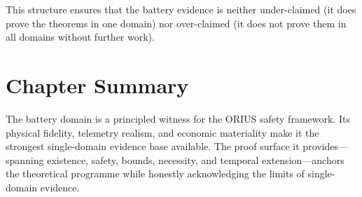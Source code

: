 This structure ensures that the battery evidence is neither under-claimed
(it does prove the theorems in one domain) nor over-claimed (it does not
prove them in all domains without further work).

\section{Chapter Summary}

The battery domain is a principled witness for the ORIUS safety framework.
Its physical fidelity, telemetry realism, and economic materiality make it
the strongest single-domain evidence base available.  The proof surface it
provides---spanning existence, safety, bounds, necessity, and temporal
extension---anchors the theoretical programme while honestly
acknowledging the limits of single-domain evidence.
